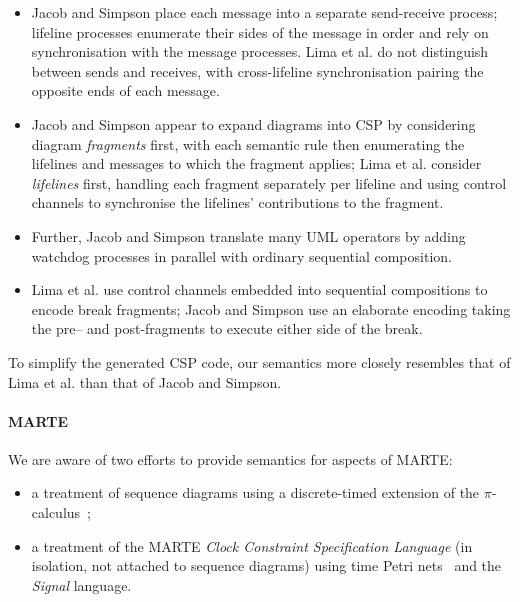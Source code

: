 \begin{itemize}
\item
  Jacob and Simpson place each message into a
  separate send-receive process; lifeline processes enumerate their
  sides of the message in order and rely on
  synchronisation with the message processes.
  Lima et al. do not
  distinguish between sends and receives, with
  cross-lifeline synchronisation pairing the opposite
  ends of each message.
\item
  Jacob and Simpson appear to expand diagrams into CSP by
  considering diagram \emph{fragments} first, with each semantic rule
  then enumerating the lifelines and messages to which the fragment applies;
  Lima et al. consider \emph{lifelines} first, handling each fragment
  separately per lifeline and using control channels to synchronise the
  lifelines' contributions to the fragment.
\item
  Further, Jacob and Simpson translate many UML operators by adding watchdog
  processes in parallel with ordinary sequential composition.
\item
  Lima et al. use control channels embedded into sequential compositions to
  encode break fragments;
  Jacob and Simpson use an elaborate encoding taking the pre-- and
  post-fragments to execute either side of the break.
\end{itemize}

To simplify the generated CSP code, our semantics more closely resembles that of
Lima et al. than that of Jacob and Simpson.

\paragraph{MARTE}

We are aware of two efforts to provide semantics for aspects of MARTE:

\begin{itemize}
  \item
    a treatment of sequence diagrams using a discrete-timed extension of
    the \(\pi\)-calculus~\cite{Jin11-MARTEPiCalculus}; 
  \item 
    a treatment of the MARTE \emph{Clock Constraint Specification Language} (in
    isolation, not attached to sequence diagrams) using time Petri
    nets~\cite{Mallet09-MARTEClockNets} and the \emph{Signal} language.
\end{itemize}

